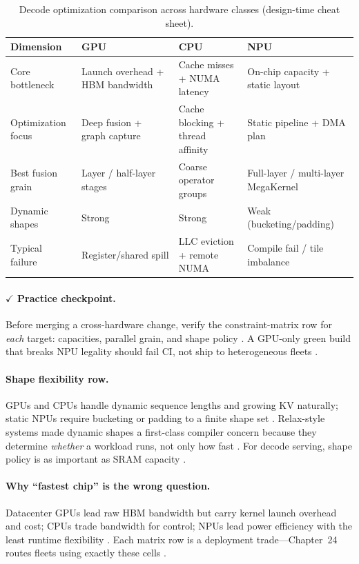 \begin{table}[t]
\centering
\small
\caption{Decode optimization comparison across hardware classes (design-time cheat sheet).}
\label{tab:tri_hw_decode_compare}
\begin{tabular}{@{}p{2.1cm}p{3.2cm}p{3.2cm}p{3.2cm}@{}}
\toprule
\textbf{Dimension} & \textbf{GPU} & \textbf{CPU} & \textbf{NPU} \\
\midrule
Core bottleneck & Launch overhead + HBM bandwidth & Cache misses + NUMA latency & On-chip capacity + static layout \\
Optimization focus & Deep fusion + graph capture & Cache blocking + thread affinity & Static pipeline + DMA plan \\
Best fusion grain & Layer / half-layer stages & Coarse operator groups & Full-layer / multi-layer MegaKernel \\
Dynamic shapes & Strong & Strong & Weak (bucketing/padding) \\
Typical failure & Register/shared spill & LLC eviction + remote NUMA & Compile fail / tile imbalance \\
\bottomrule
\end{tabular}
\end{table}

\paragraph{$\checkmark$ Practice checkpoint.}
Before merging a cross-hardware change, verify the constraint-matrix row for \emph{each} target: capacities, parallel grain, and shape policy \citep{yirage2026}.
A GPU-only green build that breaks NPU legality should fail CI, not ship to heterogeneous fleets \citep{amd2024xdna,patel2025llminference}.

\paragraph{Shape flexibility row.}
GPUs and CPUs handle dynamic sequence lengths and growing KV naturally; static NPUs require bucketing or padding to a finite shape set \citep{amd2024xdna,lai2023relax}.
Relax-style systems made dynamic shapes a first-class compiler concern because they determine \emph{whether} a workload runs, not only how fast \citep{lai2023relax}.
For decode serving, shape policy is as important as SRAM capacity \citep{kwon2023vllm}.

\paragraph{Why ``fastest chip'' is the wrong question.}
Datacenter GPUs lead raw HBM bandwidth but carry kernel launch overhead and cost; CPUs trade bandwidth for control; NPUs lead power efficiency with the least runtime flexibility \citep{taxbreak2026,memoryfloor2026,amd2024aie}.
Each matrix row is a deployment trade---Chapter~24 routes fleets using exactly these cells \citep{patel2025llminference}.

